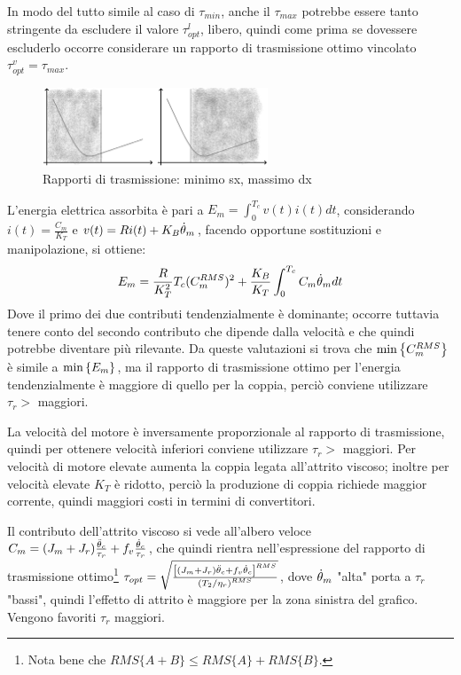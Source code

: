 In modo del tutto simile al caso di \(\tau_{min}\), anche il \(\tau_{max}\) potrebbe essere tanto stringente da escludere il valore \(\tau_{opt}^l\), libero, quindi  come prima se dovessere escluderlo occorre considerare un rapporto di trasmissione ottimo vincolato \(\tau_{opt}^v=\tau_{max}\).

\begin{figure}[h]
    \centering
    \includegraphics[width=0.6\textwidth]{Immagini/tauRmax_tauRmin.png}
    \caption{Rapporti di trasmissione: minimo sx, massimo dx}
\end{figure}


L'energia elettrica assorbita è pari a \(E_m = \int^{T_c}_0 v(t) i(t) dt\),  considerando \(i(t)=\frac{C_m}{K_T}\) e \(v(t) = R i(t) + K_B \dot{\theta}_m\), facendo opportune sostituzioni e manipolazione, si ottiene:
\[ E_m = \frac{R}{K_T^2} T_c (C^{RMS}_m)^2 + \frac{K_B}{K_T} \int^{T_c}_0 C_m\dot{\theta}_m dt \]
Dove il primo dei due contributi tendenzialmente è dominante; occorre tuttavia tenere conto del secondo contributo che dipende dalla velocità e che quindi potrebbe diventare più rilevante.
Da queste valutazioni si trova che \(\operatorname{min}\left\{ C_m^{RMS} \right\}\) è simile a \(\operatorname{min}\left\{ E_m \right\}\), ma il rapporto di trasmissione ottimo per l'energia tendenzialmente è maggiore di quello per la coppia, perciò conviene utilizzare \(\tau_r >\) maggiori.

La velocità del motore è inversamente proporzionale al rapporto di trasmissione, quindi per ottenere velocità inferiori conviene utilizzare \(\tau_r >\) maggiori.
Per velocità di motore elevate aumenta la coppia legata all'attrito viscoso; inoltre per velocità elevate \(K_T\) è ridotto, perciò la produzione di coppia richiede maggior corrente, quindi maggiori costi in termini di convertitori.

Il contributo dell'attrito viscoso si vede all'albero veloce \(C_m = (J_m+J_r)\frac{\Ddot{\theta}_c}{\tau_r} + f_v \frac{\dot{\theta}_c}{\tau_r}\), che quindi rientra nell'espressione del rapporto di trasmissione ottimo\footnote{Nota bene che \(RMS\{A+B\}\leqslant RMS\{A\} +RMS\{B\}\).} \(\tau_{opt} = \sqrt{\frac{\left[(J_m + J_r)\Ddot{\theta}_c+f_v \dot{\theta}_c\right]^{RMS}}{\left(T_2/\eta_r\right)^{RMS}}}\), dove \(\dot{\theta}_m\) "alta" porta a \(\tau_r\) "bassi", quindi l'effetto di attrito è maggiore per la zona sinistra del grafico. Vengono favoriti \(\tau_r\) maggiori.

